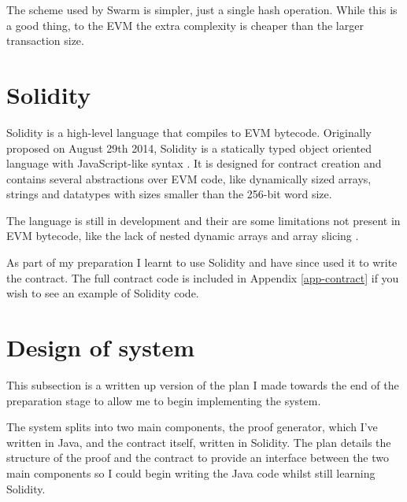 \documentclass[12pt,a4paper,twoside,openright]{report}
\begin{document}
The scheme used by Swarm is simpler, just a single hash operation.
While this is a good thing, to the EVM the extra complexity is cheaper than the larger transaction size.

\section{Solidity}

Solidity is a high-level language that compiles to EVM bytecode.
Originally proposed on August 29th 2014, Solidity is a statically typed object oriented language with JavaScript-like syntax \cite{solidity-proposal}.
It is designed for contract creation and contains several abstractions over EVM code, like dynamically sized arrays, strings and datatypes with sizes smaller than the 256-bit word size.

The language is still in development and their are some limitations not present in EVM bytecode, like the lack of nested dynamic arrays and array slicing \cite{solidity-docs}.

As part of my preparation I learnt to use Solidity and have since used it to write the contract.
The full contract code is included in Appendix \ref{app-contract} if you wish to see an example of Solidity code.






\section{Design of system}

This subsection is a written up version of the plan I made towards the end of the preparation stage to allow me to begin implementing the system.

The system splits into two main components, the proof generator, which I've written in Java, and the contract itself, written in Solidity.
The plan details the structure of the proof and the contract to provide an interface between the two
main components so I could begin writing the Java code whilst still learning Solidity.
\end{document}
